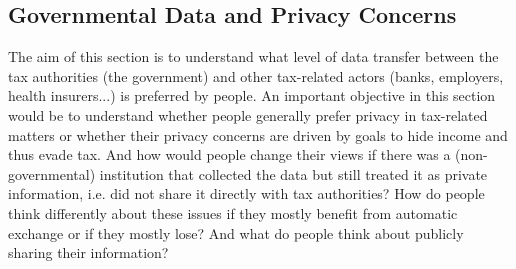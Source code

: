 \documentclass[a4paper, 12pt]{article}
\begin{document}
\subsection{Governmental Data and Privacy Concerns}
The aim of this section is to understand what level of data transfer between the tax authorities (the government) and other tax-related actors (banks, employers, health insurers...) is preferred by people. An important objective in this section would be to understand whether people generally prefer privacy in tax-related matters or whether their privacy concerns are driven by goals to hide income and thus evade tax. And how would people change their views if there was a (non-governmental) institution that collected the data but still treated it as private information, i.e. did not share it directly with tax authorities? How do people think differently about these issues if they mostly benefit from automatic exchange or if they mostly lose? And what do people think about publicly sharing their information?
\end{document}
